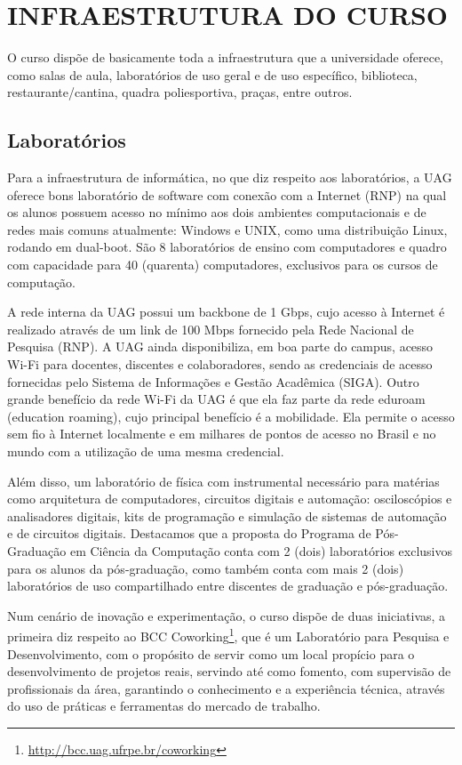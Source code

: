 \chapter{INFRAESTRUTURA DO CURSO}

O curso dispõe de basicamente toda a infraestrutura que a universidade oferece, como salas de aula, laboratórios de uso geral e de uso específico, biblioteca, restaurante/cantina, quadra poliesportiva, praças, entre outros. 

\section{Laboratórios}

Para a infraestrutura de informática, no que diz respeito aos laboratórios, a UAG oferece bons laboratório de software com conexão com a Internet (RNP) na qual os alunos possuem acesso no mínimo aos dois ambientes computacionais e de redes mais comuns atualmente: Windows e UNIX, como uma distribuição Linux, rodando em dual-boot. São 8 laboratórios de ensino com computadores e quadro com capacidade para 40 (quarenta) computadores, exclusivos para os cursos de computação.

A rede interna da UAG possui um backbone de 1 Gbps, cujo acesso à Internet é realizado através de um link de 100 Mbps fornecido pela Rede Nacional de Pesquisa (RNP). A UAG ainda disponibiliza, em boa parte do campus, acesso Wi-Fi para docentes, discentes e colaboradores, sendo as credenciais de acesso fornecidas pelo Sistema de Informações e Gestão Acadêmica (SIGA). Outro grande benefício da rede Wi-Fi da UAG é que ela faz parte da rede eduroam (education roaming), cujo principal benefício é a mobilidade. Ela permite o acesso sem fio à Internet localmente e em milhares de pontos de acesso no Brasil e no mundo com a utilização de uma mesma credencial.

Além disso, um laboratório de física com  instrumental necessário para matérias como arquitetura de computadores, circuitos digitais e automação: osciloscópios e analisadores digitais, kits de programação e simulação de sistemas de automação e de circuitos digitais. Destacamos que a proposta do Programa de Pós-Graduação em Ciência da Computação conta com 2 (dois) laboratórios exclusivos para os alunos da pós-graduação, como também conta com mais 2 (dois) laboratórios de uso compartilhado entre discentes de graduação e pós-graduação.

Num cenário de inovação e experimentação, o curso dispõe de duas iniciativas, a primeira diz respeito ao BCC Coworking\footnote{\url{http://bcc.uag.ufrpe.br/coworking}}, que é um Laboratório para Pesquisa e Desenvolvimento, com o propósito de servir como um local propício para o desenvolvimento de projetos reais, servindo até como fomento, com supervisão de profissionais da área, garantindo o conhecimento e a experiência técnica, através do uso de práticas e ferramentas do mercado de trabalho. 

